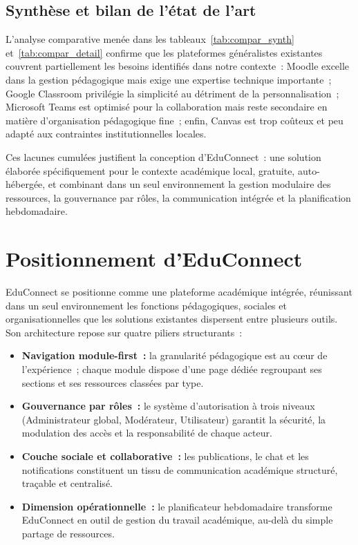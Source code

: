 
\subsection{Synth\`ese et bilan de l'\'etat de l'art}

L'analyse comparative men\'ee dans les tableaux~\ref{tab:compar_synth} et~\ref{tab:compar_detail} confirme que les plateformes g\'en\'eralistes existantes couvrent partiellement les besoins identifi\'es dans notre contexte~: Moodle excelle dans la gestion p\'edagogique mais exige une expertise technique importante~; Google Classroom privil\'egie la simplicit\'e au d\'etriment de la personnalisation~; Microsoft Teams est optimis\'e pour la collaboration mais reste secondaire en mati\`ere d'organisation p\'edagogique fine~; enfin, Canvas est trop co\^uteux et peu adapt\'e aux contraintes institutionnelles locales.

Ces lacunes cumul\'ees justifient la conception d'EduConnect~: une solution \'elabor\'ee sp\'ecifiquement pour le contexte acad\'emique local, gratuite, auto-h\'eberg\'ee, et combinant dans un seul environnement la gestion modulaire des ressources, la gouvernance par r\^oles, la communication int\'egr\'ee et la planification hebdomadaire.

\section{Positionnement d'EduConnect}
\label{sec:positionnement}

EduConnect se positionne comme une plateforme acad\'emique int\'egr\'ee, r\'eunissant dans un seul environnement les fonctions p\'edagogiques, sociales et organisationnelles que les solutions existantes dispersent entre plusieurs outils. Son architecture repose sur quatre piliers structurants~:

\begin{itemize}
  \item \textbf{Navigation module-first~:} la granularit\'e p\'edagogique est au c\oe ur de l'exp\'erience~; chaque module dispose d'une page d\'edi\'ee regroupant ses sections et ses ressources class\'ees par type.
  \item \textbf{Gouvernance par r\^oles~:} le syst\`eme d'autorisation \`a trois niveaux (Administrateur global, Mod\'erateur, Utilisateur) garantit la s\'ecurit\'e, la modulation des acc\`es et la responsabilit\'e de chaque acteur.
  \item \textbf{Couche sociale et collaborative~:} les publications, le chat et les notifications constituent un tissu de communication acad\'emique structur\'e, tra\c{c}able et centralis\'e.
  \item \textbf{Dimension op\'erationnelle~:} le planificateur hebdomadaire transforme EduConnect en outil de gestion du travail acad\'emique, au-del\`a du simple partage de ressources.
\end{itemize}

